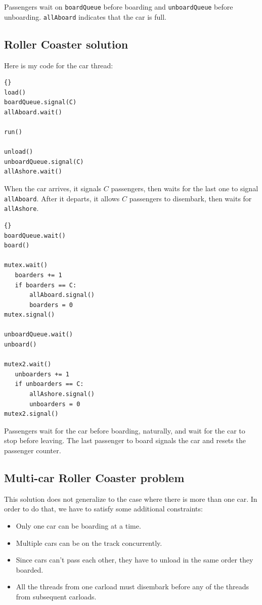 \documentclass{book}
\newcommand{\clearemptydoublepage}{\newpage\cleardoublepage}
\begin{document}
Passengers wait on {\tt boardQueue} before boarding and
{\tt unboardQueue} before unboarding.  {\tt allAboard}
indicates that the car is full.


\clearemptydoublepage
\subsection{Roller Coaster solution}

Here is my code for the car thread:

\begin{lstlisting}[title={Roller Coaster solution (car)}]{}
load()
boardQueue.signal(C)
allAboard.wait()

run()

unload()
unboardQueue.signal(C)
allAshore.wait()
\end{lstlisting}

When the car arrives, it signals $C$ passengers,
then waits for the last one to signal {\tt allAboard}.
After it departs, it allows $C$ passengers to disembark,
then waits for {\tt allAshore}.

\begin{lstlisting}[title={Roller Coaster solution (passenger)}]{}
boardQueue.wait()
board()

mutex.wait()
   boarders += 1
   if boarders == C:
       allAboard.signal()
       boarders = 0
mutex.signal()

unboardQueue.wait()
unboard()

mutex2.wait()
   unboarders += 1
   if unboarders == C:
       allAshore.signal()
       unboarders = 0
mutex2.signal()
\end{lstlisting}

Passengers wait for the car before boarding, naturally, and wait for
the car to stop before leaving.  The last passenger to board signals
the car and resets the passenger counter.


\clearemptydoublepage
\subsection{Multi-car Roller Coaster problem}

This solution does not generalize to the case where there is more
than one car.  In order to do that, we have to satisfy some additional
constraints:

\begin{itemize}

\item Only one car can be boarding at a time.

\item Multiple cars can be on the track concurrently.

\item Since cars can't pass each other, they have to unload
in the same order they boarded.

\item All the threads from one carload must disembark before
any of the threads from subsequent carloads.

\end{itemize}
\end{document}
